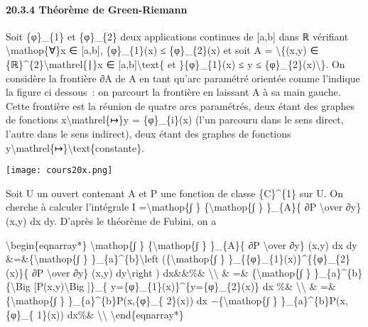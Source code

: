 \documentclass[]{article}
\begin{document}
\paragraph{20.3.4 Théorème de Green-Riemann}

Soit \{φ\}\_\{1\} et \{φ\}\_\{2\} deux applications continues de
{[}a,b{]} dans ℝ vérifiant \textbackslash{}mathop\{∀\}x ∈ {[}a,b{]},
\{φ\}\_\{1\}(x) ≤ \{φ\}\_\{2\}(x) et soit A = \textbackslash{}\{(x,y) ∈
\{ℝ\}\^{}\{2\}\textbackslash{}mathrel\{∣\}x ∈
{[}a,b{]}\textbackslash{}text\{ et \}\{φ\}\_\{1\}(x) ≤ y ≤
\{φ\}\_\{2\}(x)\textbackslash{}\}. On considère la frontière ∂A de A en
tant qu'arc paramétré orientée comme l'indique la figure ci dessous~: on
parcourt la frontière en laissant A à sa main gauche. Cette frontière
est la réunion de quatre arcs paramétrés, deux étant des graphes de
fonctions x\textbackslash{}mathrel\{↦\}y = \{φ\}\_\{i\}(x) (l'un
parcouru dans le sens direct, l'autre dans le sens indirect), deux étant
des graphes de fonctions
y\textbackslash{}mathrel\{↦\}\textbackslash{}text\{constante\}.

\texttt{[image: cours20x.png]}

Soit U un ouvert contenant A et P une fonction de classe \{C\}\^{}\{1\}
sur U. On cherche à calculer l'intégrale I =\textbackslash{}mathop\{∫ \}
\{\textbackslash{}mathop\{∫ \} \}\_\{A\}\{ ∂P \textbackslash{}over ∂y\}
(x,y) dx dy. D'après le théorème de Fubini, on a

\textbackslash{}begin\{eqnarray*\} \textbackslash{}mathop\{∫ \}
\{\textbackslash{}mathop\{∫ \} \}\_\{A\}\{ ∂P \textbackslash{}over ∂y\}
(x,y) dx dy \&=\&\{\textbackslash{}mathop\{∫ \}
\}\_\{a\}\^{}\{b\}\textbackslash{}left (\{\textbackslash{}mathop\{∫ \}
\}\_\{\{φ\}\_\{1\}(x)\}\^{}\{\{φ\}\_\{2\}(x)\}\{ ∂P \textbackslash{}over
∂y\} (x,y) dy\textbackslash{}right ) dx\&\&\%\&
\textbackslash{}\textbackslash{} \& =\& \{\textbackslash{}mathop\{∫ \}
\}\_\{a\}\^{}\{b\}\{\textbackslash{}Big {[}P(x,y)\textbackslash{}Big
{]}\}\_\{ y=\{φ\}\_\{1\}(x)\}\^{}\{y=\{φ\}\_\{2\}(x)\} dx \%\&
\textbackslash{}\textbackslash{} \& =\& \{\textbackslash{}mathop\{∫ \}
\}\_\{a\}\^{}\{b\}P(x,\{φ\}\_\{ 2\}(x)) dx −\{\textbackslash{}mathop\{∫
\} \}\_\{a\}\^{}\{b\}P(x,\{φ\}\_\{ 1\}(x)) dx\%\&
\textbackslash{}\textbackslash{} \textbackslash{}end\{eqnarray*\}
\end{document}
